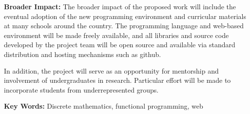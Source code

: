 {\bf Broader Impact: } The broader impact of the proposed work will
include the eventual adoption of the new programming environment and
curricular materials at many schools around the country.  The
programming language and web-based environment will be made freely
available, and all libraries and source code developed by the project
team will be open source and available via standard distribution and
hosting mechanisms such as github.

In addition, the project will serve as an opportunity for mentorship
and involvement of undergraduates in research.  Particular effort will
be made to incorporate students from underrepresented groups.

{\bf Key Words:} Discrete mathematics, functional programming, web


